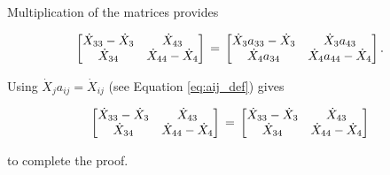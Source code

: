 \noindent Multiplication of the matrices provides

\begin{equation} \label{eq:Xdifference1Proof-3}
\begin{bmatrix} 	\dot{X}_{33} - \dot{X}_3 & \dot{X}_{43}	\\
				\dot{X}_{34} & \dot{X}_{44} - \dot{X}_4	\\
\end{bmatrix} \\
= \\
\begin{bmatrix} 	\dot{X}_3 a_{33} - \dot{X}_3 & \dot{X}_3 a_{43}	\\
				\dot{X}_4 a_{34} & \dot{X}_4 a_{44} - \dot{X}_4	\\
\end{bmatrix}.
\end{equation}

\noindent Using $\dot{X}_j a_{ij} = \dot{X}_{ij}$ (see Equation \ref{eq:aij_def}) gives

\begin{equation} \label{eq:Xdifference1Proof-4}
\begin{bmatrix} 	\dot{X}_{33} - \dot{X}_3 & \dot{X}_{43}	\\
				\dot{X}_{34} & \dot{X}_{44} - \dot{X}_4	\\
\end{bmatrix} \\
= \\
\begin{bmatrix} 	\dot{X}_{33} - \dot{X}_3 & \dot{X}_{43}	\\
				\dot{X}_{34} & \dot{X}_{44} - \dot{X}_4	\\
\end{bmatrix}
\end{equation}

\noindent to complete the proof.



